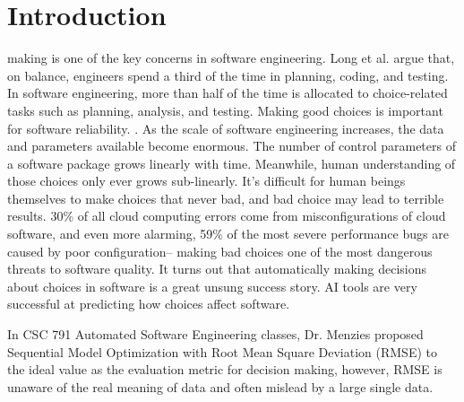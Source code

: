 \documentclass{ieeeaccess}
\begin{document}
\section{Introduction}
\label{sec:introduction}
 making is one of the key concerns in software engineering. Long et al.\cite{10352439} argue that, on balance, engineers spend a third of the time in planning, coding, and testing. In software engineering, more than half of the time is allocated to choice-related tasks such as planning, analysis, and testing. Making good choices is important for software reliability. . As the scale of software engineering increases, the data and parameters available become enormous. The number of control parameters of a software package grows linearly with time. Meanwhile, human understanding of those choices only ever grows sub-linearly\cite{10.1145/2786805.2786852}. It's difficult for human beings themselves to make choices that never bad, and bad choice may lead to terrible results. 30\% of all cloud computing errors come from misconfigurations of cloud software\cite{yy}, and even more alarming, 59\% of the most severe performance bugs are caused by poor configuration-- making bad choices one of the most dangerous threats to software quality\cite{10.1145/2961111.2962602}. It turns out that automatically making decisions about choices in software is a great unsung success story. AI tools are very successful at predicting how choices affect software\cite{9734271}.

In CSC 791 Automated Software Engineering \cite{791} classes, Dr. Menzies proposed Sequential Model Optimization with Root Mean Square Deviation (RMSE) to the ideal value as the evaluation metric for decision making, however, RMSE is unaware of the real meaning of data and often mislead by a large single data.
\end{document}
